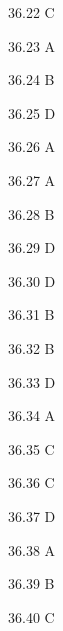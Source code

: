 \begin{Solution}{36.{22}}
C
\end{Solution}
\begin{Solution}{36.{23}}
A
\end{Solution}
\begin{Solution}{36.{24}}
B
\end{Solution}
\begin{Solution}{36.{25}}
D
\end{Solution}
\begin{Solution}{36.{26}}
A
\end{Solution}
\begin{Solution}{36.{27}}
A
\end{Solution}
\begin{Solution}{36.{28}}
B
\end{Solution}
\begin{Solution}{36.{29}}
D
\end{Solution}
\begin{Solution}{36.{30}}
D
\end{Solution}
\begin{Solution}{36.{31}}
B
\end{Solution}
\begin{Solution}{36.{32}}
B
\end{Solution}
\begin{Solution}{36.{33}}
D
\end{Solution}
\begin{Solution}{36.{34}}
A
\end{Solution}
\begin{Solution}{36.{35}}
C
\end{Solution}
\begin{Solution}{36.{36}}
C
\end{Solution}
\begin{Solution}{36.{37}}
D
\end{Solution}
\begin{Solution}{36.{38}}
A
\end{Solution}
\begin{Solution}{36.{39}}
B
\end{Solution}
\begin{Solution}{36.{40}}
C
\end{Solution}
